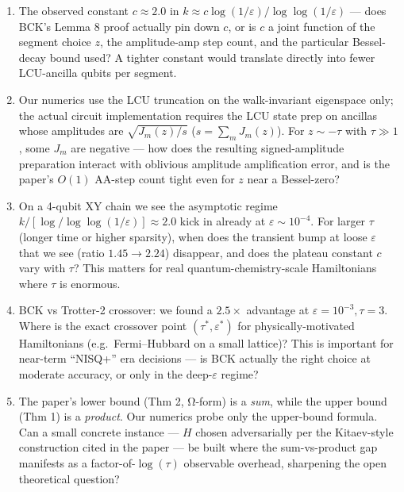 \documentclass[11pt]{article}
\newcommand{\eps}{\varepsilon}
\begin{document}
\begin{enumerate}
\item[\textbf{Q1}] The observed constant $c \approx 2.0$ in
$k \approx c\log(1/\eps)/\log\log(1/\eps)$ --- does BCK's Lemma 8
proof actually pin down $c$, or is $c$ a joint function of the
segment choice $z$, the amplitude-amp step count, and the
particular Bessel-decay bound used?  A tighter constant would
translate directly into fewer LCU-ancilla qubits per segment.
\item[\textbf{Q2}] Our numerics use the LCU truncation on the
walk-invariant eigenspace only; the actual circuit implementation
requires the LCU state prep on ancillas whose amplitudes are
$\sqrt{J_m(z)/s}$ ($s = \sum_m J_m(z)$).  For $z \sim -\tau$ with
$\tau \gg 1$, some $J_m$ are negative --- how does the resulting
signed-amplitude preparation interact with oblivious amplitude
amplification error, and is the paper's $O(1)$ AA-step count
tight even for $z$ near a Bessel-zero?
\item[\textbf{Q3}] On a 4-qubit XY chain we see the asymptotic
regime $k/[\log/\log\log(1/\eps)] \approx 2.0$ kick in already at
$\eps \sim 10^{-4}$.  For larger $\tau$ (longer time or higher
sparsity), when does the transient bump at loose $\eps$ that we
see (ratio $1.45 \to 2.24$) disappear, and does the plateau
constant $c$ vary with $\tau$?  This matters for real
quantum-chemistry-scale Hamiltonians where $\tau$ is enormous.
\item[\textbf{Q4}] BCK vs Trotter-2 crossover: we found a $2.5\times$
advantage at $\eps=10^{-3}, \tau=3$.  Where is the exact crossover
point $(\tau^*, \eps^*)$ for physically-motivated Hamiltonians
(e.g.\ Fermi--Hubbard on a small lattice)?  This is important
for near-term ``NISQ+'' era decisions --- is BCK actually the
right choice at moderate accuracy, or only in the deep-$\eps$
regime?
\item[\textbf{Q5}] The paper's lower bound (Thm 2, Ω-form) is a
\emph{sum}, while the upper bound (Thm 1) is a \emph{product}.
Our numerics probe only the upper-bound formula.  Can a small
concrete instance --- $H$ chosen adversarially per the Kitaev-style
construction cited in the paper --- be built where the sum-vs-product
gap manifests as a factor-of-$\log(\tau)$ observable overhead,
sharpening the open theoretical question?
\end{enumerate}
\end{document}
